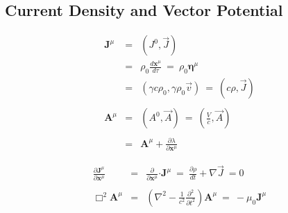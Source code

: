\documentclass[12pt]{article}
\newcommand*{\dotP}{\boldsymbol \cdot}				%
\newcommand*{\contra}[1]{\boldsymbol {#1}^{\mu}}	%
\begin{document}
\subsection{Current Density and Vector Potential}
\begin{minipage}{0.45\textwidth}
	\begin{eqnarray*}
	\contra{J} &=& (J^0, \vec{J}) \\[5pt]
		&=& \rho_0 \frac{d\contra{x}}{d\tau} \ =\  \rho_0 \contra{\eta} \\
		&=& (\gamma c \rho_0, \gamma \rho_0 \vec{v}) \ =\  (c \rho, \vec{J}) \\ \\
	\contra{A} &=& (A^0, \vec{A}) \ =\ \left( \tfrac{V}{c}, \vec{A} \right) \\ \\
		&=& \contra{A} + \frac{\partial \lambda}{\partial \contra{x}}
	\end{eqnarray*}
\end{minipage}
\hfill
\begin{minipage}{0.49\textwidth}
	\begin{eqnarray*}
	\frac{\partial \contra{J}}{\partial \contra{x}} &=& \frac{\partial}{\partial \contra{x}} \dotP \contra{J} \ =\ \frac{\partial \rho}{dt}+\nabla \vec{J}\ = 0 \\ \\
	\Box^2 \contra{A} &=& \left( \nabla^2 - \frac{1}{c^2}\frac{\partial^2}{\partial t^2} \right) \contra{A} \ =\ -\mu_0 \contra{J}
 	\end{eqnarray*}
\end{minipage}
\end{document}
